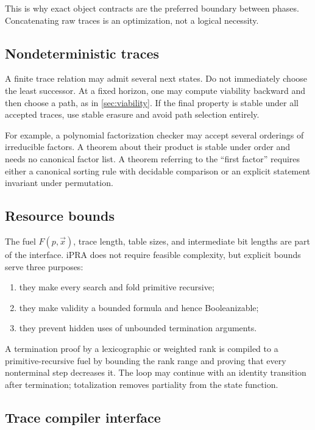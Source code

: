 This is why exact object contracts are the preferred boundary between phases.  Concatenating raw traces is an optimization, not a logical necessity.

\subsection{Nondeterministic traces}

A finite trace relation may admit several next states.  Do not immediately choose the least successor.  At a fixed horizon, one may compute viability backward and then choose a path, as in \cref{sec:viability}.  If the final property is stable under all accepted traces, use stable erasure and avoid path selection entirely.

For example, a polynomial factorization checker may accept several orderings of irreducible factors.  A theorem about their product is stable under order and needs no canonical factor list.  A theorem referring to the ``first factor'' requires either a canonical sorting rule with decidable comparison or an explicit statement invariant under permutation.

\subsection{Resource bounds}

The fuel \(F(p,\vec{x})\), trace length, table sizes, and intermediate bit lengths are part of the interface.  iPRA does not require feasible complexity, but explicit bounds serve three purposes:

\begin{enumerate}
\item they make every search and fold primitive recursive;
\item they make validity a bounded formula and hence Booleanizable;
\item they prevent hidden uses of unbounded termination arguments.
\end{enumerate}

A termination proof by a lexicographic or weighted rank is compiled to a primitive-recursive fuel by bounding the rank range and proving that every nonterminal step decreases it.  The loop may continue with an identity transition after termination; totalization removes partiality from the state function.

\subsection{Trace compiler interface}


